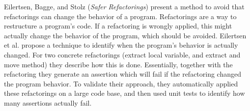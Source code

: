 

Eilertsen, Bagge, and Stolz
\cite{isola-2016-eilertsen}
({\em Safer Refactorings})
present a method to avoid that refactorings can change the behavior
of a program. 
Refactorings are a way to restructure a program's code. If a
refactoring is wrongly applied, this might actually change the
behavior of the program, which should be avoided. Eilertsen et al. propose a technique to identify when the program's behavior is actually changed. For two concrete refactorings (extract local variable, and extract and move method) they describe how this is done. Essentially, together with the refactoring they generate an assertion which will fail if the refactoring changed the program behavior. To validate their approach, they automatically applied these refactorings on a large code base, and then used unit tests to identify how many assertions actually fail.
